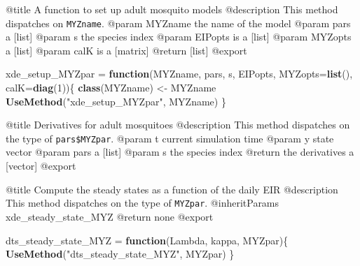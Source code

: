 \documentclass[
]{article}
\newenvironment{Shaded}{\begin{snugshade}}{\end{snugshade}}
\newcommand{\AttributeTok}[1]{\textcolor[rgb]{0.13,0.29,0.53}{#1}}
\newcommand{\ControlFlowTok}[1]{\textcolor[rgb]{0.13,0.29,0.53}{\textbf{#1}}}
\newcommand{\DecValTok}[1]{\textcolor[rgb]{0.00,0.00,0.81}{#1}}
\newcommand{\FunctionTok}[1]{\textcolor[rgb]{0.13,0.29,0.53}{\textbf{#1}}}
\newcommand{\NormalTok}[1]{#1}
\newcommand{\OtherTok}[1]{\textcolor[rgb]{0.56,0.35,0.01}{#1}}
\newcommand{\SpecialCharTok}[1]{\textcolor[rgb]{0.81,0.36,0.00}{\textbf{#1}}}
\newcommand{\StringTok}[1]{\textcolor[rgb]{0.31,0.60,0.02}{#1}}
\begin{document}
@title A function to set up adult mosquito models @description This
method dispatches on \texttt{MYZname}. @param MYZname the name of the
model @param pars a {[}list{]} @param s the species index @param EIPopts
is a {[}list{]} @param MYZopts a {[}list{]} @param calK is a
{[}matrix{]} @return {[}list{]} @export

\begin{Shaded}
\begin{Highlighting}[]
\NormalTok{xde\_setup\_MYZpar }\OtherTok{=} \ControlFlowTok{function}\NormalTok{(MYZname, pars, s, EIPopts, }\AttributeTok{MYZopts=}\FunctionTok{list}\NormalTok{(),  }\AttributeTok{calK=}\FunctionTok{diag}\NormalTok{(}\DecValTok{1}\NormalTok{))\{}
  \FunctionTok{class}\NormalTok{(MYZname) }\OtherTok{\textless{}{-}}\NormalTok{ MYZname}
  \FunctionTok{UseMethod}\NormalTok{(}\StringTok{"xde\_setup\_MYZpar"}\NormalTok{, MYZname)}
\NormalTok{\}}
\end{Highlighting}
\end{Shaded}

@title Derivatives for adult mosquitoes @description This method
dispatches on the type of \texttt{pars\$MYZpar}. @param t current
simulation time @param y state vector @param pars a {[}list{]} @param s
the species index @return the derivatives a {[}vector{]} @export

\begin{Shaded}
\end{Shaded}

@title Compute the steady states as a function of the daily EIR
@description This method dispatches on the type of \texttt{MYZpar}.
@inheritParams xde\_steady\_state\_MYZ @return none @export

\begin{Shaded}
\begin{Highlighting}[]
\NormalTok{dts\_steady\_state\_MYZ }\OtherTok{=} \ControlFlowTok{function}\NormalTok{(Lambda, kappa, MYZpar)\{}
  \FunctionTok{UseMethod}\NormalTok{(}\StringTok{"dts\_steady\_state\_MYZ"}\NormalTok{, MYZpar)}
\NormalTok{\}}
\end{Highlighting}
\end{Shaded}
\end{document}
